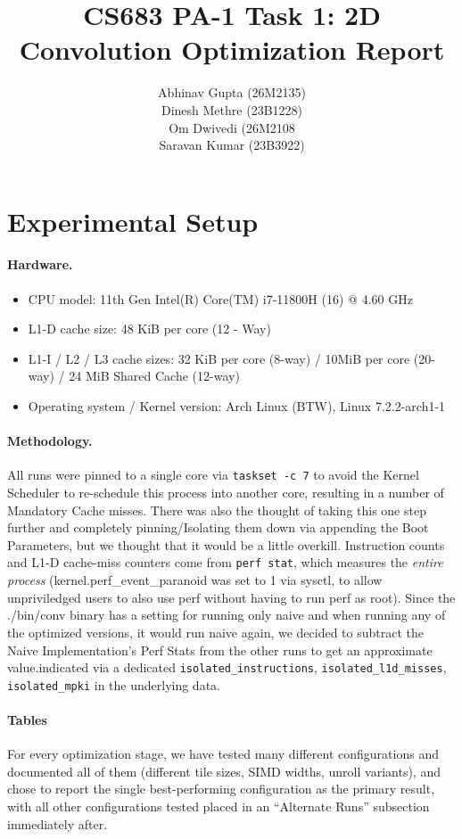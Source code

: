 \documentclass[11pt]{article}
\title{CS683 PA-1 Task 1: 2D Convolution Optimization Report}
\author{Abhinav Gupta (26M2135) \\ Dinesh Methre (23B1228) \\ Om Dwivedi (26M2108 \\ Saravan Kumar (23B3922) }
\date{}
\begin{document}
\maketitle


\section*{Experimental Setup}

\paragraph{Hardware.}
\begin{itemize}
  \item CPU model: 11th Gen Intel(R) Core(TM) i7-11800H (16) @ 4.60 GHz
  \item L1-D cache size: 48 KiB per core (12 - Way)
  \item L1-I / L2 / L3 cache sizes: 32 KiB per core (8-way) / 10MiB per core (20-way) / 24 MiB Shared Cache (12-way)
  \item Operating system / Kernel version: Arch Linux (BTW), Linux 7.2.2-arch1-1
\end{itemize}

\paragraph{Methodology.} All runs were pinned to a single core via \texttt{taskset -c 7} to avoid the Kernel Scheduler to re-schedule this process into another core, resulting in a number of Mandatory Cache misses. There was also the thought of taking this one step further and completely pinning/Isolating them down via appending the Boot Parameters, but we thought that it would be a little overkill. Instruction counts and L1-D cache-miss counters come from \texttt{perf stat}, which measures the \emph{entire process} (kernel.perf\_event\_paranoid was set to 1 via sysctl, to allow unpriviledged users to also use perf without having to run perf as root). Since the ./bin/conv binary has a setting for running only naive and when running any of the optimized versions, it would run naive again, we decided to subtract the Naive Implementation's Perf Stats from the other runs to get an approximate value.indicated via a dedicated \texttt{isolated\_instructions}, \texttt{isolated\_l1d\_misses}, \texttt{isolated\_mpki} in the underlying data.

\paragraph{Tables} For every optimization stage, we have tested many different configurations and documented all of them (different tile sizes, SIMD widths, unroll variants), and chose to report the single best-performing configuration as the primary result, with all other configurations tested placed in an ``Alternate Runs'' subsection immediately after.
\end{document}
